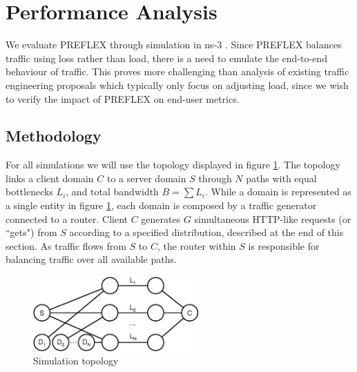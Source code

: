 \section{Performance Analysis}

We evaluate \ac{PREFLEX} through simulation in ns-3 \cite{ns3}. 
Since \ac{PREFLEX} balances traffic using loss rather than load, there is a need to emulate the end-to-end behaviour of traffic. 
This proves more challenging than analysis of existing traffic engineering proposals which typically only focus on adjusting load, since we wish to verify the impact of \ac{PREFLEX} on end-user metrics. 

\subsection{Methodology}
\label{section:methodology}

For all simulations we will use the topology displayed in figure \ref{fig:topo}. 
The topology links a client domain $C$ to a server domain $S$ through $N$ paths with equal bottlenecks $L_i$, and total bandwidth $B=\sum{L_i}$. 
While a domain is represented as a single entity in figure \ref{fig:topo}, each domain is composed by a traffic generator connected to a router. 
Client $C$ generates $G$ simultaneous \ac{HTTP}-like requests (or ``gets") from $S$ according to a specified distribution, described at the end of this section. 
As traffic flows from $S$ to $C$, the router within $S$ is responsible for balancing traffic over all available paths.

\begin{figure}
    \centering
    \includegraphics[width=2.5in]{figures/cate/topo}
    \caption{Simulation topology}
    \label{fig:topo}
\end{figure}

